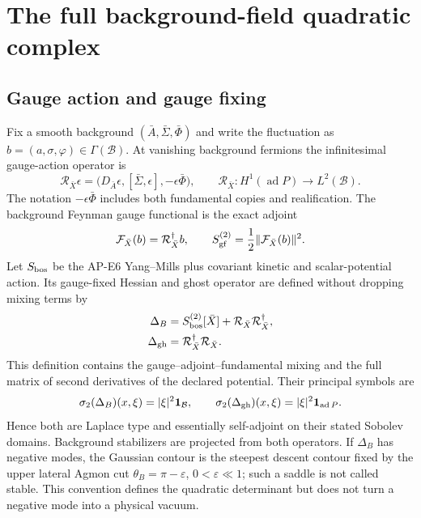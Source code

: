 \documentclass[11pt]{article}
\theoremstyle{definition}
\theoremstyle{remark}
\newcommand{\cR}{\mathcal R}
\newcommand{\cF}{\mathcal F}
\begin{document}
\section{The full background-field quadratic complex}

\subsection{Gauge action and gauge fixing}

Fix a smooth background \((\bar A,\bar\Sigma,\bar\Phi)\) and write the
fluctuation as \(b=(a,\sigma,\varphi)\in\Gamma(\mathcal B)\).  At vanishing
background fermions the infinitesimal gauge-action operator is
\begin{equation}
 \cR_{\bar X}\epsilon=
 \bigl(D_{\bar A}\epsilon,
       [\bar\Sigma,\epsilon],
       -\epsilon\bar\Phi\bigr),
 \qquad
 \cR_{\bar X}:H^1(\operatorname{ad}P)\longrightarrow L^2(\mathcal B).
 \label{eq:gauge-action}
\end{equation}
The notation \(-\epsilon\bar\Phi\) includes both fundamental copies and
realification.  The background Feynman gauge functional is the exact adjoint
\begin{equation}
 \cF_{\bar X}(b)=\cR_{\bar X}^{\dagger}b,
 \qquad
 S_{\rm gf}^{(2)}=\frac12\|\cF_{\bar X}(b)\|^2.
 \label{eq:gauge-fixing}
\end{equation}
Let \(S_{\rm bos}\) be the AP-E6 Yang--Mills plus covariant kinetic and
scalar-potential action.  Its gauge-fixed Hessian and ghost operator are
defined without dropping mixing terms by
\begin{align}
 \Delta_B&=S_{\rm bos}^{(2)}[\bar X]+\cR_{\bar X}\cR_{\bar X}^{\dagger},
 \label{eq:exact-boson-hessian}\\
 \Delta_{\rm gh}&=\cR_{\bar X}^{\dagger}\cR_{\bar X}.
 \label{eq:exact-ghost-hessian}
\end{align}
This definition contains the gauge--adjoint--fundamental mixing and the full
matrix of second derivatives of the declared potential.  Their principal
symbols are
\begin{equation}
 \sigma_2(\Delta_B)(x,\xi)=|\xi|^2\bm1_{\mathcal B},
 \qquad
 \sigma_2(\Delta_{\rm gh})(x,\xi)=|\xi|^2\bm1_{\operatorname{ad}P}.
 \label{eq:principal-symbols}
\end{equation}
Hence both are Laplace type and essentially self-adjoint on their stated
Sobolev domains.  Background stabilizers are projected from both operators.
If \(\Delta_B\) has negative modes, the Gaussian contour is the steepest
descent contour fixed by the upper lateral Agmon cut
\(\theta_B=\pi-\varepsilon\), \(0<\varepsilon\ll1\); such a saddle is not
called stable.  This convention defines the quadratic determinant but does
not turn a negative mode into a physical vacuum.
\end{document}
